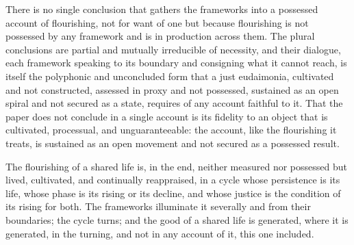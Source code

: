 \begin{claim}
There is no single conclusion that gathers the frameworks into a possessed account of flourishing, not for want of one but because flourishing is not possessed by any framework and is in production across them. The plural conclusions are partial and mutually irreducible of necessity, and their dialogue, each framework speaking to its boundary and consigning what it cannot reach, is itself the polyphonic and unconcluded form that a just eudaimonia, cultivated and not constructed, assessed in proxy and not possessed, sustained as an open spiral and not secured as a state, requires of any account faithful to it. That the paper does not conclude in a single account is its fidelity to an object that is cultivated, processual, and unguaranteeable: the account, like the flourishing it treats, is sustained as an open movement and not secured as a possessed result.
\end{claim}

\noindent
The flourishing of a shared life is, in the end, neither measured nor possessed but lived, cultivated, and continually reappraised, in a cycle whose persistence is its life, whose phase is its rising or its decline, and whose justice is the condition of its rising for both. The frameworks illuminate it severally and from their boundaries; the cycle turns; and the good of a shared life is generated, where it is generated, in the turning, and not in any account of it, this one included.

